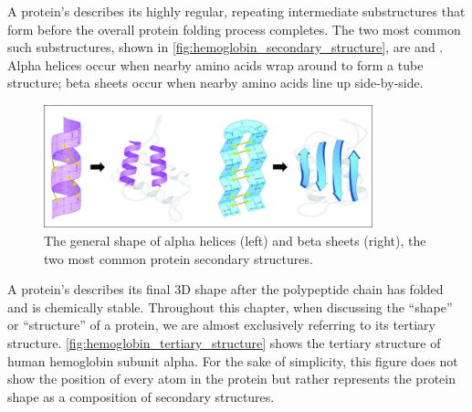 A protein's  describes its highly regular, repeating intermediate substructures that form before the overall protein folding process completes. The two most common such substructures, shown in \autoref{fig:hemoglobin_secondary_structure}, are  and . Alpha helices occur when nearby amino acids wrap around to form a tube structure; beta sheets occur when nearby amino acids line up side-by-side.\\

\begin{figure}[h]
	\centering
	\mySfFamily
	\includegraphics[width = 0.85\textwidth]{../images_CMYK/hemoglobin_secondary_structure}
	\caption{The general shape of alpha helices (left) and beta sheets (right), the two most common protein secondary structures.}
	\label{fig:hemoglobin_secondary_structure}
\end{figure}

A protein's  describes its final 3D shape after the polypeptide chain has folded and is chemically stable. Throughout this chapter, when discussing the ``shape'' or ``structure'' of a protein, we are almost exclusively referring to its tertiary structure. \autoref{fig:hemoglobin_tertiary_structure} shows the tertiary structure of human hemoglobin subunit alpha. For the sake of simplicity, this figure does not show the position of every atom in the protein but rather represents the protein shape as a composition of secondary structures.\\

